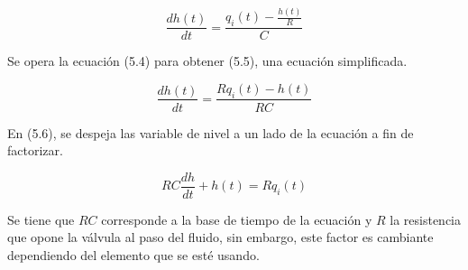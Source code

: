 \documentclass[a4paper,12pt,twoside]{proyectotanquesecci}
\begin{document}
\begin{equation}
\frac {dh\left( t\right) }{dt}=\frac {q_{i}(t)-\frac {h(t)}{R}}{C}
\end{equation}

Se opera la ecuación (5.4) para obtener (5.5), una ecuación simplificada.

\begin{equation}
\frac {dh\left( t\right) }{dt}=\frac {Rq_{i}(t)-h(t)}{RC}
\end{equation}










En (5.6), se despeja las variable de nivel a un lado de la ecuación a fin de factorizar.

\begin{equation}
RC\frac {dh}{dt}+h\left( t\right) =Rq_{i}\left( t\right)
\end{equation}

Se tiene que $RC$ corresponde a la base de tiempo de la ecuación y $R$ la resistencia que opone la válvula al paso del fluido, sin embargo, este factor es cambiante dependiendo del elemento que se esté usando. \\
\end{document}
